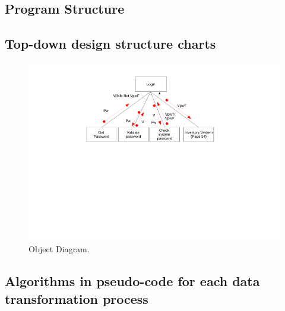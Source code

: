 \begin{landscape}

\section{Program Structure}

\subsection{Top-down design structure charts}

\begin{figure}[H]
    \begin{center}
    \includegraphics[width=500px]{./Design/top_down_design/Top_down_design.pdf}
    \caption{Object Diagram.} \label{fig:object_diagram}
    \end{center}
\end{figure}

\end{landscape}


\subsection{Algorithms in pseudo-code for each data transformation process}

